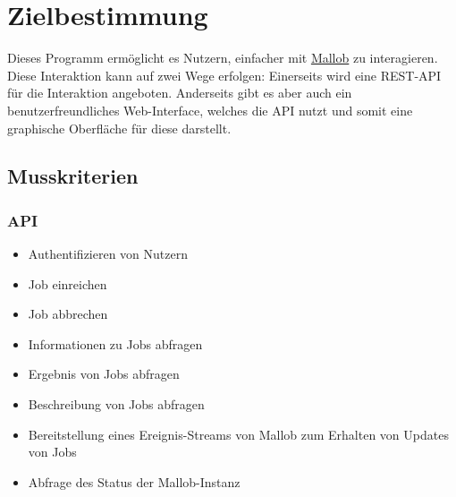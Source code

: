 \section{Zielbestimmung}
Dieses Programm ermöglicht es Nutzern, einfacher mit \href{https://github.com/domschrei/mallob}{Mallob} zu interagieren. Diese Interaktion kann auf zwei Wege erfolgen:
Einerseits wird eine REST-API für die Interaktion angeboten. Anderseits gibt es aber auch ein benutzerfreundliches Web-Interface, welches die API nutzt und somit eine graphische Oberfläche für diese darstellt.


\subsection{Musskriterien}
    \subsubsection{API}
        \begin{itemize}[noitemsep]
            \item Authentifizieren von Nutzern
            \item Job einreichen
            \item Job abbrechen
            \item Informationen zu Jobs abfragen
            \item Ergebnis von Jobs abfragen
            \item Beschreibung von Jobs abfragen
            \item Bereitstellung eines Ereignis-Streams von Mallob zum Erhalten von Updates von Jobs
            \item Abfrage des Status der Mallob-Instanz
        \end{itemize}
